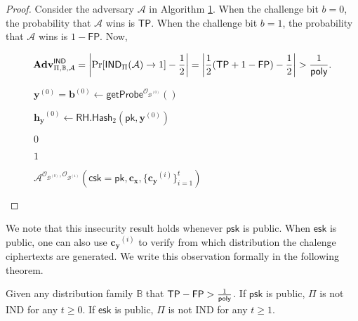 \begin{proof}

Consider the adversary $\mathcal{A}$ in Algorithm \ref{alg:rh:ind}. When the challenge bit $b = 0$, the probability that $\mathcal{A}$ wins is $\textsf{TP}$. When the challenge bit $b = 1$, the probability that $\mathcal{A}$ wins is $1 - \textsf{FP}$. Now, 

\[
	\mathbf{Adv}_{\Pi, \mathbb{B}, \mathcal{A}}^{\textsf{IND}} = \left| \Pr[ \textsf{IND}_\Pi(\mathcal{A}) \to 1 ] - \frac{1}{2} \right| = \left| \frac{1}{2} (\textsf{TP} + 1 - \textsf{FP}) - \frac{1}{2} \right| > \frac{1}{\mathsf{poly}}.
\]

\begin{figure}[h]
\centering

	\begin{minipage}[t]{0.65\textwidth}
	\begin{algorithm}[H]
	\caption{$\mathcal{A}^{\mathcal{O}_{\mathcal{B}^{(0)}}, \mathcal{O}_{\mathcal{B}^{(1)}}} ( \textsf{csk} = \textsf{pk}, \mathbf{c_x}, \{ \mathbf{c_y}^{(i)} \}_{i=1}^t )$}
	\label{alg:rh:ind}
	\begin{algorithmic}[1]

		\State $\mathbf{y}^{(0)} = \mathbf{b}^{(0)} \gets \textsf{getProbe}^{\mathcal{O}_{\mathcal{B}^{(0)}}}()$
		
		\State $\mathbf{h_y}^{(0)} \gets \textsf{RH.Hash}_2(\textsf{pk}, \mathbf{y}^{(0)})$
		
		
			\State \Return $0$
		
		\Else
			
			\State \Return $1$
		
		\EndIf
	\end{algorithmic}
	\end{algorithm}
	\end{minipage}

\end{figure}

\end{proof}

We note that this insecurity result holds whenever $\textsf{psk}$ is public. When $\textsf{esk}$ is public, one can also use $\mathbf{c_y}^{(i)}$ to verify from which distribution the chalenge ciphertexts are generated. We write this observation formally in the following theorem.

\begin{theorem}

Given any distribution family $\mathbb{B}$ that $\textsf{TP} - \textsf{FP} > \frac{1}{\mathsf{poly}}$. If $\textsf{psk}$ is public, $\Pi$ is not IND for any $t \geq 0$. If $\textsf{esk}$ is public, $\Pi$ is not IND for any $t \geq 1$.

\end{theorem}


